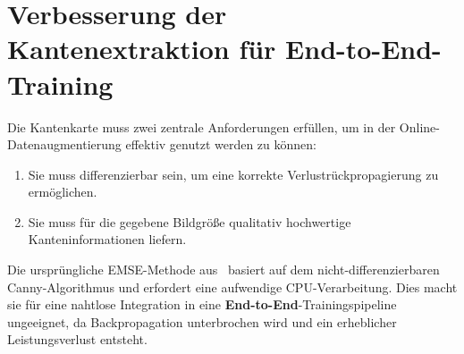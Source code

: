 \section{Verbesserung der Kantenextraktion für End-to-End-Training}
Die Kantenkarte muss zwei zentrale Anforderungen erfüllen, um in der Online-Datenaugmentierung effektiv genutzt werden zu können:
\begin{enumerate}
\item Sie muss differenzierbar sein, um eine korrekte Verlustrückpropagierung zu ermöglichen.
\item Sie muss für die gegebene Bildgröße qualitativ hochwertige Kanteninformationen liefern.
\end{enumerate}

Die ursprüngliche \ac{EMSE}-Methode aus~\cite{He_2023_ICCV} basiert auf dem nicht-differenzierbaren Canny-Algorithmus und erfordert eine aufwendige \ac{CPU}-Verarbeitung. Dies macht sie für eine nahtlose Integration in eine \textbf{End-to-End}-Trainingspipeline ungeeignet, da Backpropagation unterbrochen wird und ein erheblicher Leistungsverlust entsteht.

